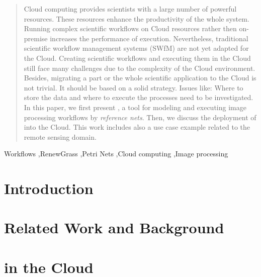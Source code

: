 \documentclass[a4paper,fleqn]{cas-sc}
\begin{document}
\begin{abstract}
Cloud computing provides scientists with a large number of powerful resources.
%
These resources enhance the productivity of the whole system.
%
Running complex scientific workflows on Cloud resources rather then on-premise increases the performance of execution.
%
Nevertheless, traditional scientific workflow management systems (SWfM) are not yet adapted for the Cloud.
%
Creating scientific workflows and executing them in the Cloud still face many challenges due to the complexity of the Cloud environment. 
%
Besides, migrating a part or the whole scientific application to the Cloud is not trivial.
%
It should be based on a solid strategy.
%
Issues like: Where to store the data and where to execute the processes need to be investigated.
%
In this paper, we first present \RenewGrass{}, a tool for modeling and executing image processing workflows by \emph{reference nets}.
%
Then, we discuss the deployment of \RenewGrass{} into the Cloud.
%
This work includes also a use case example related to the remote sensing domain.
%

\end{abstract}


\begin{keywords}
Workflows \sep RenewGrass \sep Petri Nets \sep Cloud computing \sep Image processing 
\end{keywords}

\maketitle

\section{Introduction}


\section{Related Work and Background}


\section{\RenewGrass{}}


\section{\RenewGrass{} in the Cloud}

\end{document}

